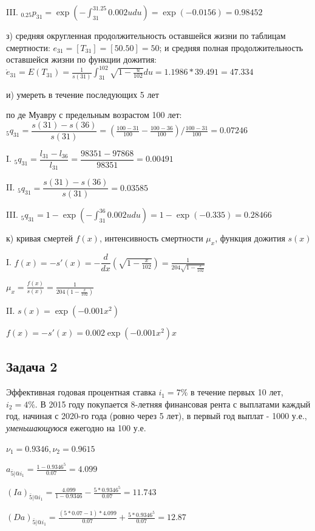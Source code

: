 \documentclass[12pt,a4paper, oneside]{extreport}
\begin{document}
III. $_{0.25}p_{31} =  \exp(-\int_{31}^{31.25} 0.002u  du  )  = \exp(-0.0156)  = 0.98452$  




з) средняя округленная продолжительность
оставшейся жизни по таблицам смертности: $ e_{31}  = [T_{31}] = [50.50] = 50  $;
и средняя полная продолжительность
оставшейся жизни по функции дожития:  $\mathring{e}_{31} = E(T_{31}) = \frac{1}{s(31)} \int_{31}^{102} \sqrt{1-\frac{u}{102}}du = 1.1986 * 39.491 = 47.334$


и) умереть в течение последующих 5
лет

по де Муавру с предельным возрастом 100 лет: $_5q_{31}=\dfrac{s(31)-s(36)}{s(31)} = (\frac{100-31}{100} -\frac{100-36}{100})/ \frac{100-31}{100}  = 0.07246$

I. $_5q_{31}=\dfrac{l_{31}-l_{36}}{l_{31}} = \dfrac{98351-97868}{98351} = 0.00491 $

II. $_5q_{31}=\dfrac{s(31)-s(36)}{s(31)} =  0.03585 $

III. $_{5}q_{31} = 1 - \exp(-\int_{31}^{36} 0.002u du  )  = 1 -  \exp(-0.335)  = 0.28466   $  


к) кривая смертей $f(x)$, интенсивность смертности $\mu_x$, функция дожития $s(x)$

I. $f(x) = - s'(x) = - \dfrac{d}{dx}(\sqrt{1-\frac{x}{102}}) =  \frac{1}{204 \sqrt{1-\frac{x}{102}} }$

$\mu_{x} = \frac{f(x)}{s(x)} =  \frac{1}{204 (1-\frac{x}{102}) }  $


II. $s(x) = \exp(- 0.001 x^2) $

$f(x) = - s'(x)=  0.002  \exp(- 0.001 x^2)  x  $

\subsection*{Задача 2}
Эффективная
годовая процентная ставка $i_1 = 7 \%$  в течение первых 10 лет, $i_2 =4 \%$. 
В 2015 году покупается  8-летняя финансовая рента с выплатами
каждый год, начиная с 2020-го года (ровно через 5 лет), в первый год
выплат - 1000 у.е., \textit{уменьшающуюся} ежегодно на 100 у.е.

$\nu_1 =  0.9346, \nu_2= 0.9615$

$a_{\bar{5}|@i_1} = \frac{1-0.9346^5}{0.07}=4.099$

$(Ia)_{\bar{5}|@i_1} = \frac{4.099}{1-0.9346}-\frac{5*0.9346^5}{0.07}=11.743$

$(Da)_{\bar{5}|@i_1} = \frac{(5*0.07-1)*4.099}{0.07}+\frac{5*0.9346^5}{0.07}=12.87$
\end{document}

